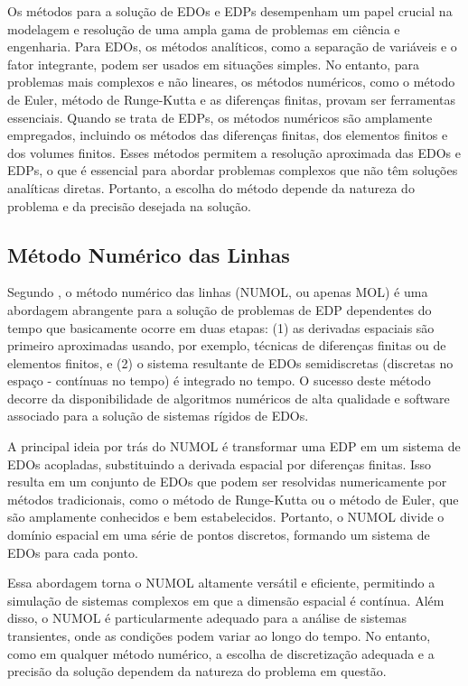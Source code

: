 Os métodos para a solução de EDOs e EDPs desempenham um papel crucial na modelagem e resolução de uma ampla gama de problemas em ciência e engenharia. Para EDOs, os métodos analíticos, como a separação de variáveis e o fator integrante, podem ser usados em situações simples. No entanto, para problemas mais complexos e não lineares, os métodos numéricos, como o método de Euler, método de Runge-Kutta e as diferenças finitas, provam ser ferramentas essenciais. Quando se trata de EDPs, os métodos numéricos são amplamente empregados, incluindo os métodos das diferenças finitas, dos elementos finitos e dos volumes finitos. Esses métodos permitem a resolução aproximada das EDOs e EDPs, o que é essencial para abordar problemas complexos que não têm soluções analíticas diretas. Portanto, a escolha do método depende da natureza do problema e da precisão desejada na solução.

\subsection{Método Numérico das Linhas}

Segundo \citet{schiesser2001}, o método numérico das linhas (NUMOL, ou apenas MOL) é uma abordagem abrangente para a solução de problemas de EDP dependentes do tempo que basicamente ocorre em duas etapas: (1) as derivadas espaciais são primeiro aproximadas usando, por exemplo, técnicas de diferenças finitas ou de elementos finitos, e (2) o sistema resultante de EDOs semidiscretas (discretas no espaço - contínuas no tempo) é integrado no tempo. O sucesso deste método decorre da disponibilidade de algoritmos numéricos de alta qualidade e software associado para a solução de sistemas rígidos de EDOs.

A principal ideia por trás do NUMOL é transformar uma EDP em um sistema de EDOs acopladas, substituindo a derivada espacial por diferenças finitas. Isso resulta em um conjunto de EDOs que podem ser resolvidas numericamente por métodos tradicionais, como o método de Runge-Kutta ou o método de Euler, que são amplamente conhecidos e bem estabelecidos. Portanto, o NUMOL divide o domínio espacial em uma série de pontos discretos, formando um sistema de EDOs para cada ponto.

Essa abordagem torna o NUMOL altamente versátil e eficiente, permitindo a simulação de sistemas complexos em que a dimensão espacial é contínua. Além disso, o NUMOL é particularmente adequado para a análise de sistemas transientes, onde as condições podem variar ao longo do tempo. No entanto, como em qualquer método numérico, a escolha de discretização adequada e a precisão da solução dependem da natureza do problema em questão.

